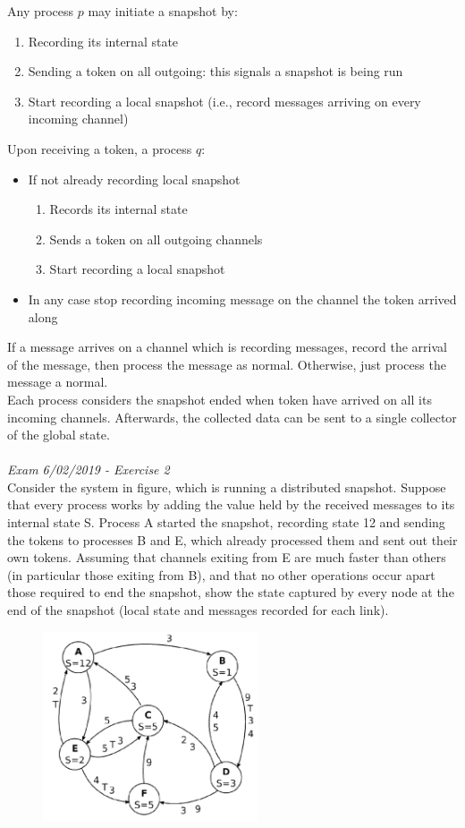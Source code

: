 \documentclass[10pt,a4paper]{article}
\begin{document}
Any process $p$ may initiate a snapshot by:
\begin{enumerate}
	\item Recording its internal state
	\item Sending a token on all outgoing: this signals a snapshot is being run
	\item Start recording a local snapshot (i.e., record messages arriving on every incoming channel)
\end{enumerate}
Upon receiving a token, a process $q$:
\begin{itemize}
	\item If not already recording local snapshot
	\begin{enumerate}
		\item Records its internal state
		\item Sends a token on all outgoing channels
		\item Start recording a local snapshot
	\end{enumerate}
	\item In any case stop recording incoming message on the channel the token arrived along
\end{itemize}
If a message arrives on a channel which is recording messages, record the arrival of the message, then process the message as normal. Otherwise, just process the message a normal. \\
Each process considers the snapshot ended when token have arrived on all its incoming channels. Afterwards, the collected data can be sent to a single collector of the global state. \\ \\
\textit{Exam 6/02/2019 - Exercise 2} \\
Consider the system in figure, which is running a distributed snapshot. Suppose that every process works by adding the value held by the received messages to its internal state S. Process A started the snapshot, recording state 12 and sending the tokens to processes B and E, which already processed them and sent out their own tokens. Assuming that channels exiting from E are much faster than others (in particular those exiting from B), and that no other operations occur apart those required to end the snapshot, show the state captured by every node at the end of the snapshot (local state and messages recorded for each link).
\begin{figure}[h!]
 \hfill \includegraphics[width=180pt]{images/snap-ex.png}\hspace*{\fill}
  \label{fig:snap-ex}
\end{figure} \\
\end{document}
